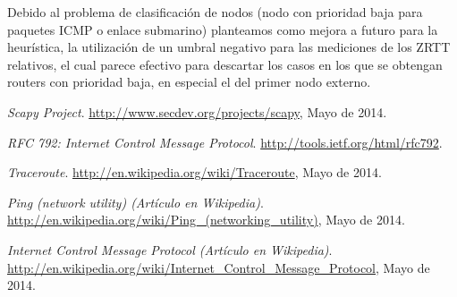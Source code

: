 \documentclass[a4paper, 10pt, twoside]{article}
\begin{document}
Debido al problema de clasificación de nodos (nodo con prioridad baja para paquetes ICMP o enlace submarino) planteamos como mejora a futuro para la heurística, la utilización de un umbral negativo para las mediciones de los ZRTT relativos, el cual parece efectivo para descartar los casos en los que se obtengan routers con prioridad baja, en especial el del primer nodo externo.




\begin{thebibliography}{9}

	\emph{Scapy Project}.
	\url{http://www.secdev.org/projects/scapy}, 
	Mayo de 2014.

  \emph{RFC 792: Internet Control Message Protocol}.
  \url{http://tools.ietf.org/html/rfc792}.

  \emph{Traceroute}.
  \url{http://en.wikipedia.org/wiki/Traceroute},
  Mayo de 2014.

  \emph{Ping (network utility) (Artículo en Wikipedia)}.
  \url{http://en.wikipedia.org/wiki/Ping_(networking_utility)},
  Mayo de 2014.

  \emph{Internet Control Message Protocol (Artículo en Wikipedia)}.
  \url{http://en.wikipedia.org/wiki/Internet_Control_Message_Protocol},
  Mayo de 2014.
	
\end{thebibliography}
\end{document}
